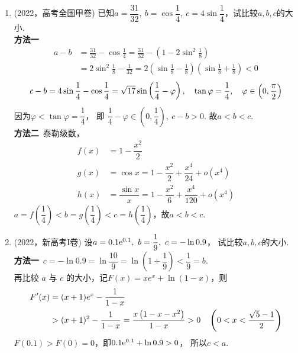 \begin{enumerate}[label={【\textbf{例\thechapter.\arabic*}】},
 leftmargin=\inteval{\myenumleftmargin}pt,
 itemsep=\inteval{\myenumitempsep}pt,
 itemindent=\inteval{\myenumitemindent}pt]
\item\label{比大小问题2022全国甲} (2022，高考全国甲卷)
已知$a=\dfrac{31}{32},\ b=\cos\dfrac{1}{4},\ c=4\sin\dfrac{1}{4}$，试比较$a,b,c$的大小. \\
\textbf{方法一}\ 
\begin{align*}
    a-b &=\frac{31}{32}-\cos \frac{1}{4}=\frac{31}{32}-\left(1-2 \sin ^{2} \frac{1}{8}\right)\\ &=2 \sin ^{2} \frac{1}{8}-\frac{1}{32} 
    =2\left(\sin \frac{1}{8}-\frac{1}{8}\right)\left(\sin \frac{1}{8}+\frac{1}{8}\right) <0
\end{align*}
\begin{align*}
    c-b=4 \sin \frac{1}{4}-\cos \frac{1}{4}=\sqrt{17} \sin \left(\frac{1}{4}-\varphi\right),\quad  
    \tan \varphi=\frac{1}{4}, \quad 
    \varphi \in\left(0, \frac{\pi}{2}\right)
\end{align*}
因为$ \varphi<\tan \varphi=\dfrac{1}{4} $， 即 $\dfrac{1}{4}-\varphi \in\left(0, \dfrac{1}{4}\right),\ c-b>0 $. 故$a<b<c$. \\
\textbf{方法二}\ 泰勒级数，
\begin{align*}
    f(x) &=1-\dfrac{x^{2}}{2} \\
    g(x) &=\cos x=1-\dfrac{x^{2}}{2}+\dfrac{x^{4}}{24}+o\left(x^{4}\right) \\
    h(x) &=\dfrac{\sin x}{x}=1-\dfrac{x^{2}}{6}+\dfrac{x^{4}}{120}+
    o\left(x^{4}\right)
\end{align*}
$ a=f\left(\dfrac{1}{4}\right)<b=g\left(\dfrac{1}{4}\right)
<c=h\left(\dfrac{1}{4}\right)$，故$a<b<c$. 

\item\label{比大小问题2022新高考I} (2022，新高考I卷)
设$a=0.1\e^{0.1},\ b=\dfrac{1}{9},\ c=-\ln0.9 $，
试比较$a,b,c$的大小. \\
\textbf{方法一}\ $ c=-\ln 0.9=\ln \dfrac{10}{9}=
\ln \left(1+\dfrac{1}{9}\right)<\dfrac{1}{9}=b $. \\
再比较 $a$ 与 $c$ 的大小，记$F(x)=x e^{x}+\ln (1-x)$，则
\begin{align*}
    F'(x) &=(x+1)e^{x}-\frac{1}{1-x} \\ &>(x+1)^2-\dfrac{1}{1-x}=
    \frac{x\left(1-x-x^{2}\right)}{1-x}>0 \quad 
    \left(0<x<\dfrac{\sqrt{5}-1}{2} \right)
\end{align*}
$ F(0.1)>F(0)=0 $，即$ 0.1 \mathrm{e}^{0.1}+\ln 0.9>0 $， 所以$c<a$.


\end{enumerate}

